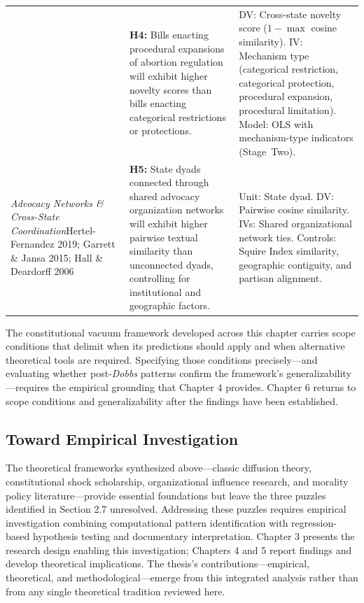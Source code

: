 \begin{table}[!t]
\begin{tabular}{@{}>{\raggedright\arraybackslash}p{3.4cm} >{\raggedright\arraybackslash}p{5.6cm} >{\raggedright\arraybackslash}p{4.8cm}@{}}
& \textbf{H4:} Bills enacting procedural expansions of abortion regulation will exhibit higher novelty scores than bills enacting categorical restrictions or protections. 
& DV: Cross-state novelty score ($1 - \max$ cosine similarity). IV: Mechanism type (categorical restriction, categorical protection, procedural expansion, procedural limitation). Model: OLS with mechanism-type indicators (Stage~Two). \\
\addlinespace[3pt]
\textit{Advocacy Networks \& Cross-State Coordination}\newline\scriptsize Hertel-Fernandez 2019; Garrett \& Jansa 2015; Hall \& Deardorff 2006 
& \textbf{H5:} State dyads connected through shared advocacy organization networks will exhibit higher pairwise textual similarity than unconnected dyads, controlling for institutional and geographic factors. 
& Unit: State dyad. DV: Pairwise cosine similarity. IVs: Shared organizational network ties. Controls: Squire Index similarity, geographic contiguity, and partisan alignment. \\
\bottomrule
\end{tabular}
\end{table}
\clearpage

The constitutional vacuum framework developed across this chapter carries scope conditions that delimit when its predictions should apply and when alternative theoretical tools are required. Specifying those conditions precisely---and evaluating whether post-\emph{Dobbs} patterns confirm the framework's generalizability---requires the empirical grounding that Chapter 4 provides. Chapter 6 returns to scope conditions and generalizability after the findings have been established.

\subsection{Toward Empirical Investigation}
The theoretical frameworks synthesized above---classic diffusion theory, constitutional shock scholarship, organizational influence research, and morality policy literature---provide essential foundations but leave the three puzzles identified in Section 2.7 unresolved. Addressing these puzzles requires empirical investigation combining computational pattern identification with regression-based hypothesis testing and documentary interpretation. Chapter 3 presents the research design enabling this investigation; Chapters 4 and 5 report findings and develop theoretical implications. The thesis's contributions---empirical, theoretical, and methodological---emerge from this integrated analysis rather than from any single theoretical tradition reviewed here.

